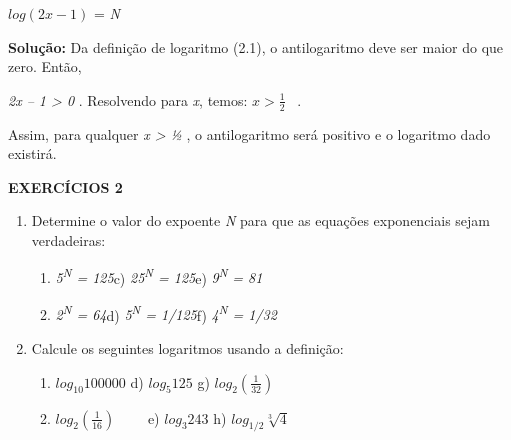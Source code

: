 \documentclass[12pt]{article}
\begin{document}
\begin{enumerate}[label*={\fontsize{14pt}{14pt}\selectfont \textbf{\arabic*.}}]
\begin{Center}
 \( log \left( 2x-1 \right)  \)  = \textit{N}
\end{Center}\par

\textbf{Solução:} Da definição de logaritmo (2.1), o antilogaritmo deve ser maior do que zero. Então,\par

\textit{2x – 1 > 0} . Resolvendo para \textit{x}, temos:  \( x>\frac{1}{2} \) \  .\par

Assim, para qualquer \textit{x > ½} , o antilogaritmo será positivo e o logaritmo dado existirá.\par

 \par

{\fontsize{14pt}{16.8pt}\selectfont \textbf{EXERCÍCIOS 2}\par}\par

\begin{enumerate}
	\item Determine o valor do expoente \textit{N} para que as equações exponenciais sejam verdadeiras:\par

\begin{enumerate}
	\item \textit{5\textsuperscript{N} = 125\tab \tab }c) \textit{25\textsuperscript{N} = 125\tab \tab }e) \textit{9\textsuperscript{N} = 81}\par

	\item \textit{2\textsuperscript{N} = 64\tab }\tab d) \textit{5\textsuperscript{N} = 1/125\tab \tab }f)\textit{ 4\textsuperscript{N} = 1/32}
\end{enumerate}\par


\vspace{\baselineskip}
	\item Calcule os seguintes logaritmos usando a definição:\par

\begin{enumerate}
	\item  \( log_{10}100000 \) \tab \tab d)  \( log_{5}125 \) \tab \tab g)  \( log_{2} \left( \frac{1}{32} \right)  \) \par

	\item  \( log_{2} \left( \frac{1}{16} \right)  \) \ \ \ \  \tab \tab e)  \( log_{3}243 \) \tab \tab h)  \( log_{1/2}\sqrt[3]{4} \) \par


\end{enumerate}
\end{enumerate}
\end{enumerate}
\end{document}
